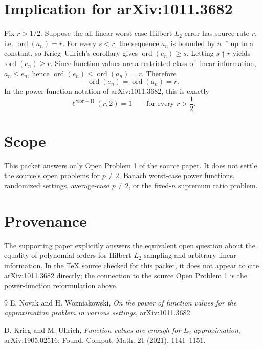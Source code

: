 \documentclass[11pt]{amsart}
\DeclareMathOperator{\ord}{ord}
\newcommand{\ellworH}{\ell^{\,\mathrm{wor-H}}}
\begin{document}
\section*{Implication for arXiv:1011.3682}

Fix \(r>1/2\).  Suppose the all-linear worst-case Hilbert \(L_2\) error has
source rate \(r\), i.e. \(\ord(a_n)=r\).  For every \(s<r\), the sequence
\(a_n\) is bounded by \(n^{-s}\) up to a constant, so Krieg--Ullrich's
corollary gives \(\ord(e_n)\ge s\).  Letting \(s\uparrow r\) yields
\(\ord(e_n)\ge r\).  Since function values are a restricted class of linear
information, \(a_n\le e_n\), hence \(\ord(e_n)\le \ord(a_n)=r\).  Therefore
\[
  \ord(e_n)=\ord(a_n)=r.
\]
In the power-function notation of arXiv:1011.3682, this is exactly
\[
  \ellworH(r,2)=1
  \qquad\text{for every }r>\frac12.
\]

\section*{Scope}

This packet answers only Open Problem 1 of the source paper.  It does not
settle the source's open problems for \(p\ne2\), Banach worst-case power
functions, randomized settings, average-case \(p\ne2\), or the fixed-\(n\)
supremum ratio problem.

\section*{Provenance}

The supporting paper explicitly answers the equivalent open question about
the equality of polynomial orders for Hilbert \(L_2\) sampling and arbitrary
linear information.  In the TeX source checked for this packet, it does not
appear to cite arXiv:1011.3682 directly; the connection to the source Open
Problem 1 is the power-function reformulation above.

\begin{thebibliography}{9}
E. Novak and H. Wozniakowski,
\emph{On the power of function values for the approximation problem in
various settings},
arXiv:1011.3682.

D. Krieg and M. Ullrich,
\emph{Function values are enough for \(L_2\)-approximation},
arXiv:1905.02516; Found. Comput. Math. 21 (2021), 1141--1151.
\end{thebibliography}
\end{document}

